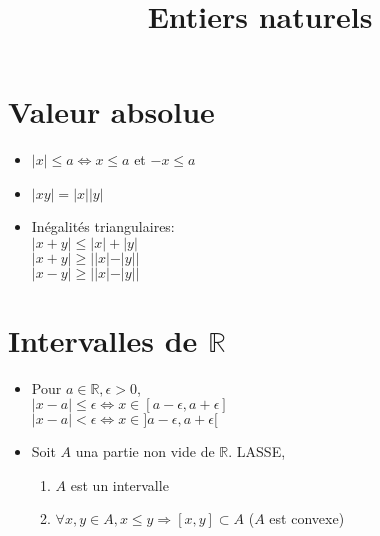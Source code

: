 \documentclass[fleqn]{article}
\title{Entiers naturels}
\date{}
\begin{document}
\maketitle

\section{Valeur absolue}
\begin{itemize}
	\item $|x| \leq a \Leftrightarrow x \leq a$ et $-x \leq a$
	\item $|xy| = |x||y|$
	\item In\'egalit\'es triangulaires: \\
		$|x+y| \leq |x| + |y|$ \\
		$|x+y| \geq ||x| - |y||$ \\
		$|x-y| \geq ||x| - |y||$
\end{itemize}

\section{Intervalles de $\mathbb{R}$}
\begin{itemize}
	\item Pour $a \in \mathbb{R}, \epsilon > 0$, \\
		$|x-a| \leq \epsilon \Leftrightarrow x \in [a - \epsilon, a + \epsilon]$ \\
		$|x-a| < \epsilon \Leftrightarrow x \in ]a - \epsilon, a + \epsilon[$
	\item Soit $A$ una partie non vide de $\mathbb{R}$. LASSE,
		\begin{enumerate}
			\item $A$ est un intervalle
			\item $\forall x,y \in A, x \leq y \Rightarrow [x,y] \subset A$ ($A$ est convexe)
		\end{enumerate}
\end{itemize}
\end{document}

